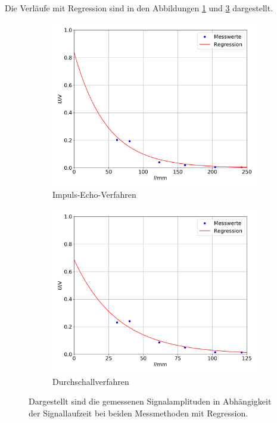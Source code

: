Die Verläufe mit Regression sind in den Abbildungen \ref{abb:3} und \ref{abb:4} dargestellt.
\begin{figure}
  \centering
  \begin{subfigure}{0.49\textwidth}
    \centering
    \includegraphics[width=\textwidth]{ImpDump.pdf}
    \caption{Impuls-Echo-Verfahren}
    \label{abb:3}
  \end{subfigure}
  \begin{subfigure}{0.49\textwidth}
    \centering
    \includegraphics[width=\textwidth]{DurDump.pdf}
    \caption{Durchschallverfahren}
    \label{abb:4}
  \end{subfigure}
  \caption{Dargestellt sind die gemessenen Signalamplituden in Abhängigkeit
  der Signallaufzeit bei beiden Messmethoden mit Regression.}
\end{figure}
